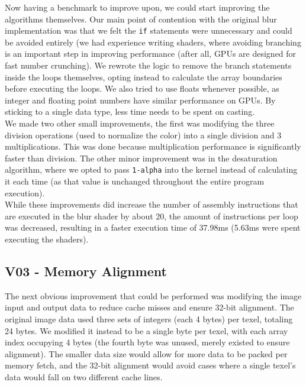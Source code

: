 \documentclass[10pt,journal,compsoc]{IEEEtran}
\def\code#1{\texttt{#1}}
\begin{document}
\noindent Now having a benchmark to improve upon, we could start improving the algorithms themselves. Our main point of contention with the original blur implementation was that we felt the \code{if} statements were unnecessary and could be avoided entirely (we had experience writing shaders, where avoiding branching is an important step in improving performance (after all, GPUs are designed for fast number crunching). We rewrote the logic to remove the branch statements inside the loops themselves, opting instead to calculate the array boundaries before executing the loops. We also tried to use floats whenever possible, as integer and floating point numbers have similar performance on GPUs. By sticking to a single data type, less time needs to be spent on casting. \\

\noindent We made two other small improvements, the first was modifying the three division operations (used to normalize the color) into a single division and 3 multiplications. This was done because multiplication performance is significantly faster than division. The other minor improvement was in the desaturation algorithm, where we opted to pass \code{1-alpha} into the kernel instead of calculating it each time (as that value is unchanged throughout the entire program execution). \\

\noindent While these improvements did increase the number of assembly instructions that are executed in the blur shader by about 20, the amount of instructions per loop was decreased, resulting in a faster execution time of 37.98ms (5.63ms were spent executing the shaders). \\


\subsection{V03 - Memory Alignment}
\label{sec:V03}

\noindent The next obvious improvement that could be performed was modifying the image input and output data to reduce cache misses and ensure 32-bit alignment. The original image data used three sets of integers (each 4 bytes) per texel, totaling 24 bytes. We modified it instead to be a single byte per texel, with each array index occupying 4 bytes (the fourth byte was unused, merely existed to ensure alignment). The smaller data size would allow for more data to be packed per memory fetch, and the 32-bit alignment would avoid cases where a single texel's data would fall on two different cache lines. \\
\end{document}
